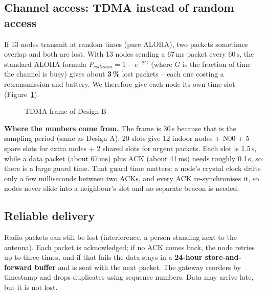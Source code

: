 \documentclass[11pt,a4paper]{report}
\newcommand{\why}[1]{\par\noindent\colorbox{gray!10}{\parbox{\dimexpr\linewidth-2\fboxsep}{\small\textbf{Where the numbers come from.} #1}}\par}
\begin{document}
\subsection{Channel access: TDMA instead of random access}
If 13 nodes transmit at random times (pure ALOHA), two packets sometimes overlap and both are lost. With 13 nodes sending a 67\,ms packet every 60\,s, the standard ALOHA formula $P_{collision} = 1 - e^{-2G}$ (where $G$ is the fraction of time the channel is busy) gives about \textbf{3\,\%} lost packets -- each one costing a retransmission and battery. We therefore give each node its own time slot (Figure~\ref{fig:tdma}).

\begin{figure}[htbp]
\centering
{}
\caption{TDMA frame of Design B}\label{fig:tdma}
\end{figure}

\why{The frame is 30\,s because that is the sampling period (same as Design A). 20 slots give 12 indoor nodes + N00 + 5 spare slots for extra nodes + 2 shared slots for urgent packets. Each slot is 1.5\,s, while a data packet (about 67\,ms) plus ACK (about 41\,ms) needs roughly 0.1\,s, so there is a large guard time. That guard time matters: a node's crystal clock drifts only a few milliseconds between two ACKs, and every ACK re-synchronises it, so nodes never slide into a neighbour's slot and no separate beacon is needed.}

\subsection{Reliable delivery}
Radio packets can still be lost (interference, a person standing next to the antenna). Each packet is acknowledged; if no ACK comes back, the node retries up to three times, and if that fails the data stays in a \textbf{24-hour store-and-forward buffer} and is sent with the next packet. The gateway reorders by timestamp and drops duplicates using sequence numbers. Data may arrive late, but it is not lost.
\end{document}
